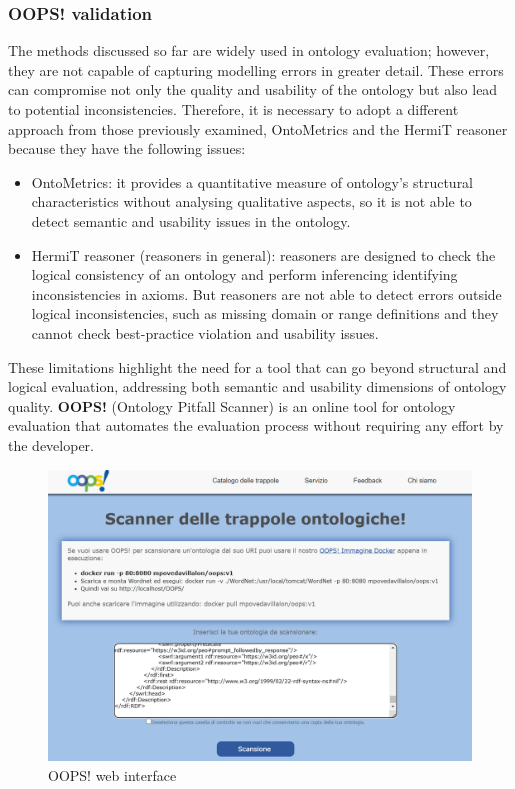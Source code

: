\subsubsection{OOPS! validation}
The methods discussed so far are widely used in ontology evaluation; however, they are not capable of capturing modelling errors in greater detail. These errors can compromise not only the quality and usability of the ontology but also lead to potential inconsistencies. Therefore, it is necessary to adopt a different approach from those previously examined, OntoMetrics and the HermiT reasoner because they have the following issues:
\begin{itemize}
    \item OntoMetrics: it provides a quantitative measure of ontology's structural characteristics without analysing qualitative aspects, so it is not able to detect semantic and usability issues in the ontology.

    \item HermiT reasoner (reasoners in general): reasoners are designed to check the logical consistency of an ontology and perform inferencing identifying inconsistencies in axioms. But reasoners are not able to detect errors outside logical inconsistencies, such as missing domain or range definitions and they cannot check best-practice violation and usability issues.
\end{itemize}
These limitations highlight the need for a tool that can go beyond structural and logical evaluation, addressing both semantic and usability dimensions of ontology quality. \textbf{OOPS!} (Ontology Pitfall Scanner) is an online tool for ontology evaluation \cite{poveda2014oops} that automates the evaluation process without requiring any effort by the developer. 
\begin{figure}[H]
    \centering
    \includegraphics[width=0.9\linewidth]{Figures/fig_42.png}
    \caption{OOPS! web interface}
    \label{fig:enter-label}
\end{figure}

